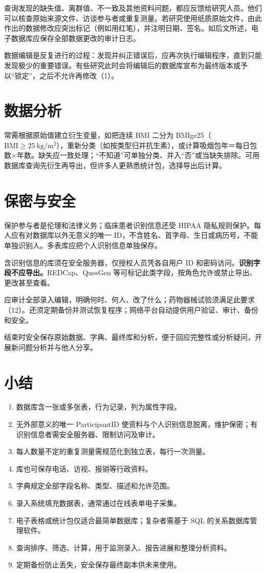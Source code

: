 查询发现的缺失值、离群值、不一致及其他资料问题，都应反馈给研究人员。他们可以核查原始来源文件、访谈参与者或重复测量。若研究使用纸质原始文件，由此作出的数据修改应突出标记（例如用红笔），并注明日期、签名。如后文所述，电子数据库应保存全部数据更改的审计日志。

数据编辑是反复进行的过程：发现并纠正错误后，应再次执行编辑程序，直到只能发现极少的重要错误。有些研究此时会将编辑后的数据库宣布为最终版本或予以“锁定”，之后不允许再修改（1）。

\section{数据分析}
常需根据原始值建立衍生变量，如把连续 BMI 二分为 BMIge25（$\mathrm{BMI}\ge25\ \mathrm{kg/m^2}$），重新分类（如按类型归并抗生素），或计算吸烟包年＝每日包数$\times$年数。缺失应一致处理；“不知道”可单独分类、并入“否”或当缺失排除。可用数据库查询先衍生再导出，但许多人更熟悉统计包，选择导出后计算。

\section{保密与安全}
保护参与者是伦理和法律义务；临床患者识别信息还受 HIPAA 隐私规则保护。每人应有对数据库以外无意义的唯一 ID，不含姓名、首字母、生日或病历号，不能单独识别人。多表库应把个人识别信息单独保存。

含识别信息的库须在安全服务器，仅授权人员凭各自用户 ID 和密码访问。\textbf{识别字段不应导出。}REDCap、QuesGen 等可标记此类字段，按角色允许或禁止导出、更改甚至查看。

应审计全部录入编辑，明确何时、何人、改了什么；药物器械试验须满足此要求（12）。还须定期备份并测试恢复程序；网络平台自动提供用户验证、审计、备份和安全。

结束时安全保存原始数据、字典、最终库和分析，便于回应完整性或分析疑问，开展新问题分析并与他人分享。

\section{小结}
\begin{enumerate}
\item 数据库含一张或多张表，行为记录，列为属性字段。
\item 无外部意义的唯一 ParticipantID 使资料与个人识别信息脱离，维护保密；有识别信息者需安全服务器、限制访问及审计。
\item 每人数量不定的重复测量需规范化到独立表，每行一次测量。
\item 库也可保存电话、访视、报销等行政资料。
\item 字典规定全部字段名称、类型、描述和允许范围。
\item 录入系统填充数据表，通常通过在线表单电子采集。
\item 电子表格或统计包仅适合最简单数据库；复杂者需基于 SQL 的关系数据库管理软件。
\item 查询排序、筛选、计算，用于监测录入、报告进展和整理分析资料。
\item 定期备份防止丢失，安全保存最终副本供未来使用。
\end{enumerate}


